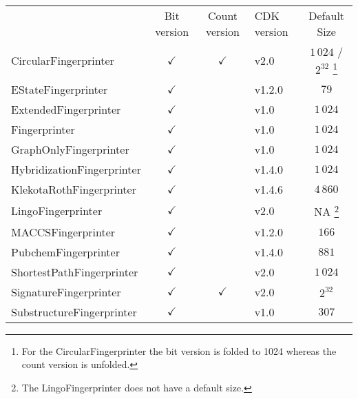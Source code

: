 \documentclass[doublespacing]{bmcart}
\def \cdkversion {v2.0}
\begin{document}
\begin{backmatter}
    \begin{minipage}{1\textwidth}
    \renewcommand*{\thempfootnote}{\fnsymbol{mpfootnote}}
    \centering
    \begin{tabular}{lcclc}
                             & Bit version  & Count version & CDK version & Default Size    \\
  CircularFingerprinter~\cite{rogers2010extended, Clark2014}      & $\checkmark$ & $\checkmark$  & \cdkversion{}     & $1\,024$ / $2^{32}$%
\footnote[1]{For the CircularFingerprinter the bit version is folded to 1024 whereas the count version is unfolded.} \\
  EStateFingerprinter~\cite{Hall1995}       & $\checkmark$ &               & v1.2.0       & $79$            \\
  ExtendedFingerprinter      & $\checkmark$ &               & v1.0         & $1\,024$        \\
  Fingerprinter              & $\checkmark$ &               & v1.0         & $1\,024$        \\
  GraphOnlyFingerprinter     & $\checkmark$ &               & v1.0         & $1\,024$        \\
  HybridizationFingerprinter & $\checkmark$ &               & v1.4.0       & $1\,024$        \\
  KlekotaRothFingerprinter~\cite{Klekota2008}   & $\checkmark$ &               & v1.4.6       & $4\,860$        \\
  LingoFingerprinter~\cite{vidal2005lingo}         & $\checkmark$ &               & \cdkversion{}     & NA%
\footnote[2]{The LingoFingerprinter does not have a default size.}
                                                                                             \\
  MACCSFingerprinter         & $\checkmark$ &               & v1.2.0       & $166$           \\
  PubchemFingerprinter~\cite{pubchemFP}       & $\checkmark$ &               & v1.4.0       & $881$            \\
  ShortestPathFingerprinter  & $\checkmark$ &               & \cdkversion{}     & $1\,024$        \\
  SignatureFingerprinter~\cite{signaturefingerprints}     & $\checkmark$ & $\checkmark$  & \cdkversion{}     & $2^{32}$         \\
  SubstructureFingerprinter  & $\checkmark$ &               & v1.0         & $307$           \\

    \end{tabular}
    \end{minipage}


\end{backmatter}
\end{document}
